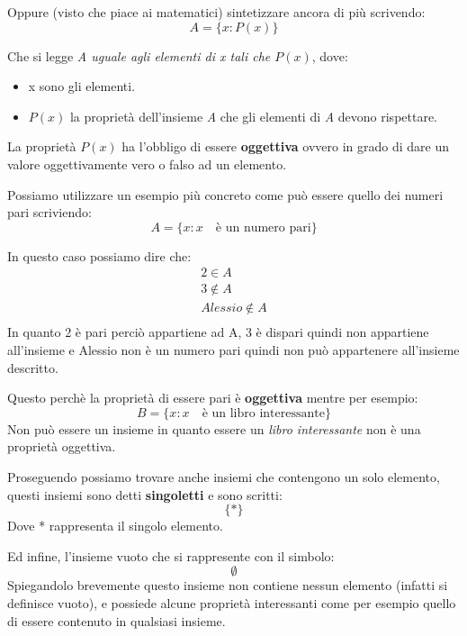 \documentclass{article}
\begin{document}
Oppure (visto che piace ai matematici) sintetizzare ancora di più scrivendo:
\begin{equation}
        A = \{x : P(x)\}
\end{equation}

Che si legge \textit{A uguale agli elementi di x tali che $P(x)$}, dove:
\begin{itemize}
        \item x sono gli elementi.
        \item $P(x)$ la proprietà dell'insieme \textit{A} che gli elementi di \textit{A} devono rispettare.
\end{itemize}
La proprietà $P(x)$ ha l'obbligo di essere \textbf{oggettiva} ovvero in grado di dare un valore oggettivamente vero o falso ad un elemento. \par
Possiamo utilizzare un esempio più concreto come può essere quello dei numeri pari scriviendo:
\begin{equation}
        A = \{x : x \quad \textrm{è un numero pari} \} 
\end{equation}

In questo caso possiamo dire che:
\begin{align*}
        2 \in A \\
        3 \not \in A \\
        Alessio \not \in A \\ 
\end{align*}
In quanto 2 è pari perciò appartiene ad A, 3 è dispari quindi non appartiene all'insieme e Alessio non è un numero pari quindi non può appartenere all'insieme descritto.

Questo perchè la proprietà di essere pari è \textbf{oggettiva} mentre per esempio:
\begin{equation}
        B = \{x : x \quad \textrm{è un libro interessante} \} 
\end{equation}
Non può essere un insieme in quanto essere un \textit{libro interessante} non è una proprietà oggettiva.

Proseguendo possiamo trovare anche insiemi che contengono un solo elemento, questi insiemi sono detti \textbf{singoletti} e sono scritti:
\begin{equation}\label{def_singoletto}
        \{*\}
\end{equation}
Dove * rappresenta il singolo elemento.

Ed infine, l'insieme vuoto che si rappresente con il simbolo:
\begin{equation}
        \emptyset 
\end{equation}
Spiegandolo brevemente questo insieme non contiene nessun elemento (infatti si definisce vuoto), e possiede alcune proprietà interessanti come per esempio quello di essere contenuto in qualsiasi insieme.
\end{document}
